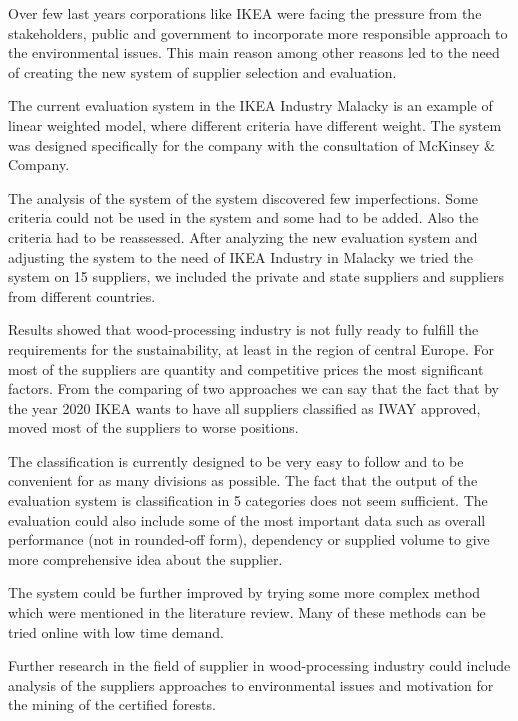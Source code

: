 \documentclass[oneside,12pt]{article}%
\begin{document}

Over few last years corporations like IKEA were facing the pressure from the stakeholders, public and government to incorporate more responsible approach to the environmental issues. This main reason among other reasons led to the need of creating the new system of supplier selection and evaluation. \par
The current evaluation system in the IKEA Industry Malacky is an example of linear weighted model, where different criteria have different weight. The system was designed specifically for the company with the consultation of McKinsey & Company. \par
The analysis of the system of the system discovered few imperfections. Some criteria could not be used in the system and some had to be added. Also the criteria had to be reassessed. After analyzing the new evaluation system and adjusting the system to the need of IKEA Industry in Malacky we tried the system on 15 suppliers, we included the private and state suppliers and suppliers from different countries.  \par
Results showed that wood-processing industry is not fully ready to fulfill the requirements for the sustainability, at least in the region of central Europe. For most of the suppliers are quantity and competitive prices the most significant factors. From the comparing of  two approaches we can say that the fact that by the year 2020 IKEA wants to have all suppliers classified as IWAY approved, moved most of the suppliers to worse positions.  \par
The classification is currently designed to be very easy to follow and to be convenient for as many divisions as possible. The fact that the output of the evaluation system is classification in 5 categories does not seem sufficient. The evaluation could also include some of the most important data such as overall performance (not in rounded-off form), dependency or supplied volume to give more comprehensive idea about the supplier. \par
The system could be further improved by trying some more complex method which were mentioned in the literature review. Many of these methods can be tried online with low time demand. \par
Further research in the field of supplier in wood-processing industry could include analysis of the suppliers approaches to environmental issues and motivation for the mining of the certified forests.
\end{document}
